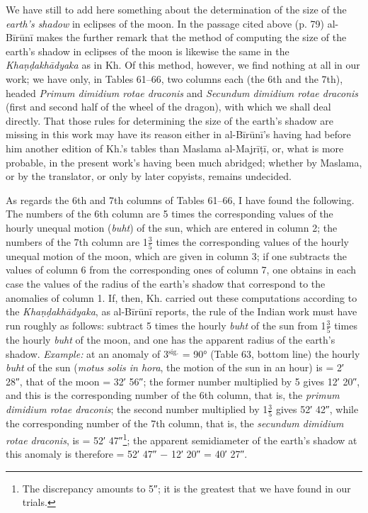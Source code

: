 \documentclass[11pt]{article}
\newcommand{\Pg}[1]{\marginpar{\footnotesize\color{gray}#1}}
\begin{document}
\par \Pg{90}We have still to add here something about the determination of the size of the \emph{earth's shadow} in eclipses of the moon. In the passage cited above (p. 79) al-Bīrūnī makes the further remark that the method of computing the size of the earth's shadow in eclipses of the moon is likewise the same in the \emph{Khaṇḍakhādyaka} as in Kh. Of this method, however, we find nothing at all in our work; we have only, in Tables 61–66, two columns each (the 6th and the 7th), headed \emph{Primum dimidium rotae draconis} and \emph{Secundum dimidium rotae draconis} (first and second half of the wheel of the dragon), with which we shall deal directly. That those rules for determining the size of the earth's shadow are missing in this work may have its reason either in al-Bīrūnī's having had before him another edition of Kh.'s tables than Maslama al-Majrīṭī, or, what is more probable, in the present work's having been much abridged; whether by Maslama, or by the translator, or only by later copyists, remains undecided.\par
\par As regards the 6th and 7th columns of Tables 61–66, I have found the following. The numbers of the 6th column are 5 times the corresponding values of the hourly unequal motion (\emph{buht}) of the sun, which are entered in column 2; the numbers of the 7th column are 1$\tfrac{3}{5}$ times the corresponding values of the hourly unequal motion of the moon, which are given in column 3; if one subtracts the values of column 6 from the corresponding ones of column 7, one obtains in each case the values of the radius of the earth's shadow that correspond to the anomalies of column 1. If, then, Kh. carried out these computations according to the \emph{Khaṇḍakhādyaka}, as al-Bīrūnī reports, the rule of the Indian work must have run roughly as follows: subtract 5 times the hourly \emph{buht} of the sun from 1$\tfrac{3}{5}$ times the hourly \emph{buht} of the moon, and one has the apparent radius of the earth's shadow. \emph{Example:} at an anomaly of 3$^{\text{sig.}}$ = 90° (Table 63, bottom line) the hourly \emph{buht} of the sun (\emph{motus solis in hora}, the motion of the sun in an hour) is = 2′ 28″, that of the moon = 32′ 56″; the former number multiplied by 5 gives 12′ 20″, and this is the corresponding number of the 6th column, that is, the \emph{primum dimidium rotae draconis}; the second number multiplied by 1$\tfrac{3}{5}$ gives 52′ 42″, while the corresponding number of the 7th column, that is, the \emph{secundum dimidium rotae draconis}, is = 52′ 47″\footnote{The discrepancy amounts to 5″; it is the greatest that we have found in our trials.}; the apparent semidiameter of the earth's shadow at this anomaly is therefore = 52′ 47″ − 12′ 20″ = 40′ 27″.\par
\end{document}
